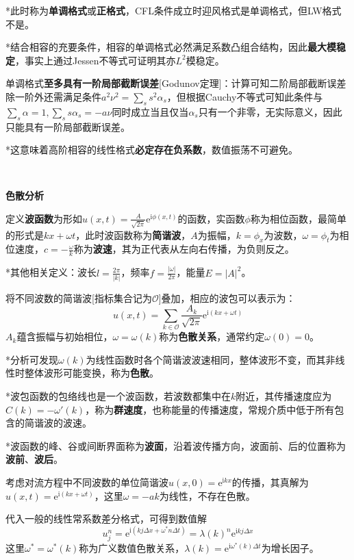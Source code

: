 \documentclass[a4paper,UTF8,fontset=windows]{ctexart}
\begin{document}
*此时称为\textbf{单调格式}或\textbf{正格式}，CFL条件成立时迎风格式是单调格式，但LW格式不是。

*结合相容的充要条件，相容的单调格式必然满足系数凸组合结构，因此\textbf{最大模稳定}，事实上通过Jessen不等式可证明其亦$L^2$模稳定。

单调格式\textbf{至多具有一阶局部截断误差}[Godunov定理]：计算可知二阶局部截断误差除一阶外还需满足条件$a^2\nu^2=\sum_ss^2\alpha_s$，但根据Cauchy不等式可知此条件与$\sum_s\alpha=1,\sum_ss\alpha_s=-a\nu$同时成立当且仅当$\alpha_s$只有一个非零，无实际意义，因此只能具有一阶局部截断误差。

*这意味着高阶相容的线性格式\textbf{必定存在负系数}，数值振荡不可避免。

\

\textbf{色散分析}

定义\textbf{波函数}为形如$u(x,t)=\frac{A}{\sqrt{2\pi}}\mathrm{e}^{\mathrm{i}\phi(x,t)}$的函数，实函数$\phi$称为相位函数，最简单的形式是$kx+\omega t$，此时波函数称为\textbf{简谐波}，$A$为振幅，$k=\phi_x$为波数，$\omega=\phi_t$为相位速度，$c=-\frac{\omega}{k}$称为\textbf{波速}，其为正代表从左向右传播，为负则反之。

*其他相关定义：波长$l=\frac{2\pi}{|k|}$，频率$f=\frac{|\omega|}{2\pi}$，能量$E=|A|^2$。

将不同波数的简谐波[指标集合记为$\mathcal{O}$]叠加，相应的波包可以表示为：
$$u(x,t)=\sum_{k\in\mathcal{O}}\frac{A_k}{\sqrt{2\pi}}\mathrm{e}^{\mathrm{i}(kx+\omega t)}$$
$A_k$蕴含振幅与初始相位，$\omega=\omega(k)$称为\textbf{色散关系}，通常约定$\omega(0)=0$。

*分析可发现$\omega(k)$为线性函数时各个简谐波波速相同，整体波形不变，而其非线性时整体波形可能变换，称为\textbf{色散}。

*波包函数的包络线也是一个波函数，若波数都集中在$k$附近，其传播速度应为$C(k)=-\omega'(k)$，称为\textbf{群速度}，也称能量的传播速度，常规介质中低于所有包含的简谐波的波速。

*波函数的峰、谷或间断界面称为\textbf{波面}，沿着波传播方向，波面前、后的位置称为\textbf{波前}、\textbf{波后}。

考虑对流方程中不同波数的单位简谐波$u(x,0)=\mathrm{e}^{\mathrm{i}kx}$的传播，其真解为$u(x,t)=\mathrm{e}^{\mathrm{i}(kx+\omega t)}$，这里$\omega=-ak$为线性，不存在色散。

代入一般的线性常系数差分格式，可得到数值解
$$u_j^n=\mathrm{e}^{\mathrm{i}(kj\Delta x+\omega^*n\Delta t)}=\lambda(k)^n\mathrm{e}^{\mathrm{i}kj\Delta x}$$
这里$\omega^*=\omega^*(k)$称为广义数值色散关系，$\lambda(k)=\mathrm{e}^{\mathrm{i}\omega^*(k)\Delta t}$为增长因子。
\end{document}
